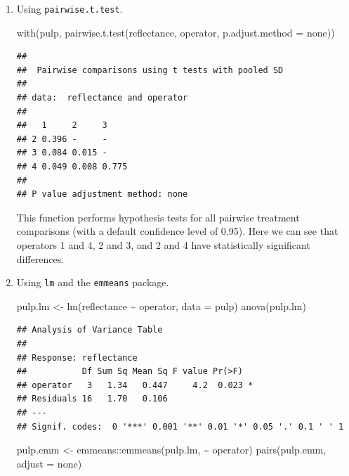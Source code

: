 \documentclass[
]{book}
\newenvironment{Shaded}{\begin{snugshade}}{\end{snugshade}}
\newcommand{\AttributeTok}[1]{\textcolor[rgb]{0.77,0.63,0.00}{#1}}
\newcommand{\FunctionTok}[1]{\textcolor[rgb]{0.00,0.00,0.00}{#1}}
\newcommand{\NormalTok}[1]{#1}
\newcommand{\OtherTok}[1]{\textcolor[rgb]{0.56,0.35,0.01}{#1}}
\newcommand{\SpecialCharTok}[1]{\textcolor[rgb]{0.00,0.00,0.00}{#1}}
\newcommand{\StringTok}[1]{\textcolor[rgb]{0.31,0.60,0.02}{#1}}
\theoremstyle{definition}
\theoremstyle{definition}
\theoremstyle{definition}
\theoremstyle{definition}
\theoremstyle{remark}
\begin{document}
\begin{enumerate}
\def\labelenumi{\arabic{enumi}.}
\item
  Using \texttt{pairwise.t.test}.

\begin{Shaded}
\begin{Highlighting}[]
\FunctionTok{with}\NormalTok{(pulp, }
 \FunctionTok{pairwise.t.test}\NormalTok{(reflectance, operator, }\AttributeTok{p.adjust.method =} \StringTok{\textquotesingle{}none\textquotesingle{}}\NormalTok{))}
\end{Highlighting}
\end{Shaded}

\begin{verbatim}
## 
##  Pairwise comparisons using t tests with pooled SD 
## 
## data:  reflectance and operator 
## 
##   1     2     3    
## 2 0.396 -     -    
## 3 0.084 0.015 -    
## 4 0.049 0.008 0.775
## 
## P value adjustment method: none
\end{verbatim}

  This function performs hypothesis tests for all pairwise treatment comparisons (with a default confidence level of 0.95). Here we can see that operators 1 and 4, 2 and 3, and 2 and 4 have statistically significant differences.
\item
  Using \texttt{lm} and the \texttt{emmeans} package.

\begin{Shaded}
\begin{Highlighting}[]
\NormalTok{pulp.lm }\OtherTok{\textless{}{-}} \FunctionTok{lm}\NormalTok{(reflectance }\SpecialCharTok{\textasciitilde{}}\NormalTok{ operator, }\AttributeTok{data =}\NormalTok{ pulp)}
\FunctionTok{anova}\NormalTok{(pulp.lm)}
\end{Highlighting}
\end{Shaded}

\begin{verbatim}
## Analysis of Variance Table
## 
## Response: reflectance
##           Df Sum Sq Mean Sq F value Pr(>F)  
## operator   3   1.34   0.447     4.2  0.023 *
## Residuals 16   1.70   0.106                 
## ---
## Signif. codes:  0 '***' 0.001 '**' 0.01 '*' 0.05 '.' 0.1 ' ' 1
\end{verbatim}

\begin{Shaded}
\begin{Highlighting}[]
\NormalTok{pulp.emm }\OtherTok{\textless{}{-}}\NormalTok{ emmeans}\SpecialCharTok{::}\FunctionTok{emmeans}\NormalTok{(pulp.lm, }\SpecialCharTok{\textasciitilde{}}\NormalTok{ operator)}
\FunctionTok{pairs}\NormalTok{(pulp.emm, }\AttributeTok{adjust =} \StringTok{\textquotesingle{}none\textquotesingle{}}\NormalTok{)}
\end{Highlighting}
\end{Shaded}


\end{enumerate}
\end{document}
